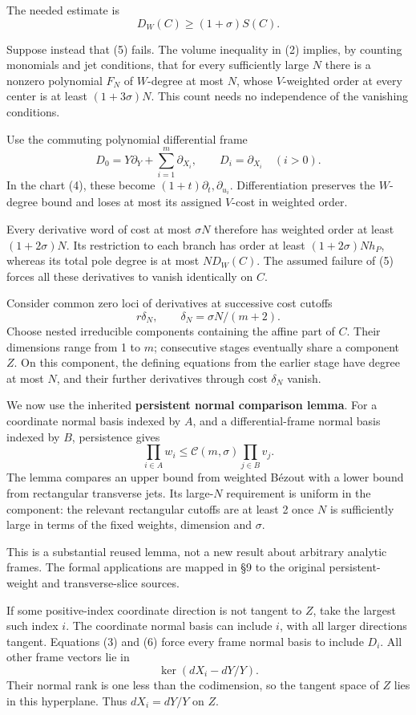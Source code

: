 The needed estimate is
\[
D_W(C)\ge(1+\sigma)S(C).
\tag{5}
\]

Suppose instead that (5) fails. The volume inequality in (2) implies, by counting monomials and jet conditions, that for every sufficiently large \(N\) there is a nonzero polynomial \(F_N\) of \(W\)-degree at most \(N\), whose \(V\)-weighted order at every center is at least \((1+3\sigma)N\). This count needs no independence of the vanishing conditions.

Use the commuting polynomial differential frame
\[
D_0=Y\partial_Y+\sum_{i=1}^m\partial_{X_i},
\qquad D_i=\partial_{X_i}\quad(i>0).
\]
In the chart (4), these become \((1+t)\partial_t,\partial_{u_i}\). Differentiation preserves the \(W\)-degree bound and loses at most its assigned \(V\)-cost in weighted order.

Every derivative word of cost at most \(\sigma N\) therefore has weighted order at least \((1+2\sigma)N\). Its restriction to each branch has order at least \((1+2\sigma)Nh_P\), whereas its total pole degree is at most \(ND_W(C)\). The assumed failure of (5) forces all these derivatives to vanish identically on \(C\).

Consider common zero loci of derivatives at successive cost cutoffs
\[
r\delta_N,\qquad \delta_N=\sigma N/(m+2).
\]
Choose nested irreducible components containing the affine part of \(C\). Their dimensions range from 1 to \(m\); consecutive stages eventually share a component \(Z\). On this component, the defining equations from the earlier stage have degree at most \(N\), and their further derivatives through cost \(\delta_N\) vanish.

We now use the inherited \textbf{persistent normal comparison lemma}. For a coordinate normal basis indexed by \(A\), and a differential-frame normal basis indexed by \(B\), persistence gives
\[
\prod_{i\in A}w_i\le
\mathcal C(m,\sigma)\prod_{j\in B}v_j.
\tag{6}
\]
The lemma compares an upper bound from weighted Bézout with a lower bound from rectangular transverse jets. Its large-\(N\) requirement is uniform in the component: the relevant rectangular cutoffs are at least 2 once \(N\) is sufficiently large in terms of the fixed weights, dimension and \(\sigma\).

This is a substantial reused lemma, not a new result about arbitrary analytic frames. The formal applications are mapped in §9 to the original persistent-weight and transverse-slice sources.

If some positive-index coordinate direction is not tangent to \(Z\), take the largest such index \(i\). The coordinate normal basis can include \(i\), with all larger directions tangent. Equations (3) and (6) force every frame normal basis to include \(D_i\). All other frame vectors lie in
\[
\ker(dX_i-dY/Y).
\]
Their normal rank is one less than the codimension, so the tangent space of \(Z\) lies in this hyperplane. Thus \(dX_i=dY/Y\) on \(Z\).

